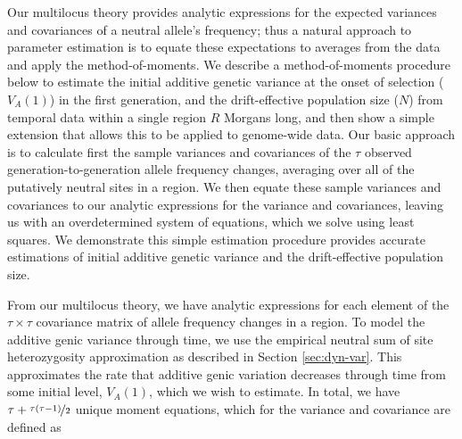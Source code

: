 \documentclass[11pt]{article}
\begin{document}
Our multilocus theory provides analytic expressions for the expected variances
and covariances of a neutral allele's frequency; thus a natural approach to
parameter estimation is to equate these expectations to averages from the data
and apply the method-of-moments. We describe a method-of-moments procedure
below to estimate the initial additive genetic variance at the onset of
selection ($V_A(1)$) in the first generation, and the drift-effective
population size ($N$) from temporal data within a single region $R$ Morgans
long, and then show a simple extension that allows this to be applied to
genome-wide data. Our basic approach is to calculate first the sample variances
and covariances of the $\tau$ observed generation-to-generation allele
frequency changes, averaging over all of the putatively neutral sites in a
region. We then equate these sample variances and covariances to our analytic
expressions for the variance and covariances, leaving us with an overdetermined
system of equations, which we solve using least squares. We demonstrate this
simple estimation procedure provides accurate estimations of initial additive
genetic variance and the drift-effective population size.

From our multilocus theory, we have analytic expressions for each element of
the $\tau \times \tau$ covariance matrix of allele frequency changes in a
region. To model the additive genic variance through time, we use the empirical
neutral sum of site heterozygosity approximation as described in Section
\ref{sec:dyn-var}. This approximates the rate that additive genic variation
decreases through time from some initial level, $V_A(1)$, which we wish to
estimate. In total, we have $\tau + \nicefrac{\tau(\tau-1)}{2}$ unique moment
equations, which for the variance and covariance are defined as
\end{document}
